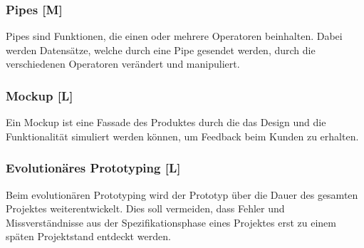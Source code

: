 \subsubsection{Pipes [M]}
\label{txt:glos:Pipes}
Pipes sind Funktionen, die einen oder mehrere Operatoren beinhalten. Dabei werden Datensätze, welche durch eine Pipe gesendet werden, durch die verschiedenen Operatoren verändert und manipuliert. \cite{Pipes}

\subsubsection{Mockup [L]}
\label{glos:mockup}
Ein Mockup ist eine Fassade des Produktes durch die das Design und die Funktionalität simuliert werden können, um Feedback beim Kunden zu erhalten. \cite{Mokup}


\subsubsection{Evolutionäres Prototyping [L]}
\label{ch::ongoing-prototyping}
Beim evolutionären Prototyping wird der Prototyp über die Dauer des gesamten Projektes weiterentwickelt. Dies soll vermeiden, dass Fehler und Missverständnisse aus der Spezifikationsphase eines Projektes erst zu einem späten Projektstand entdeckt werden. \cite{Prototyping}